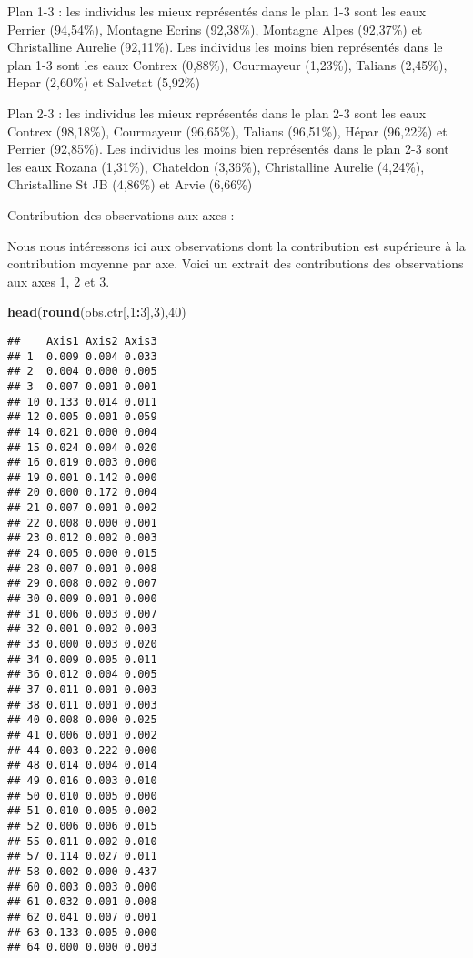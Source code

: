 \documentclass[]{article}
\newenvironment{Shaded}{\begin{snugshade}}{\end{snugshade}}
\newcommand{\KeywordTok}[1]{\textcolor[rgb]{0.13,0.29,0.53}{\textbf{#1}}}
\newcommand{\DecValTok}[1]{\textcolor[rgb]{0.00,0.00,0.81}{#1}}
\newcommand{\OperatorTok}[1]{\textcolor[rgb]{0.81,0.36,0.00}{\textbf{#1}}}
\newcommand{\NormalTok}[1]{#1}
\begin{document}
Plan 1-3 : les individus les mieux représentés dans le plan 1-3 sont les
eaux Perrier (94,54\%), Montagne Ecrins (92,38\%), Montagne Alpes
(92,37\%) et Christalline Aurelie (92,11\%). Les individus les moins
bien représentés dans le plan 1-3 sont les eaux Contrex (0,88\%),
Courmayeur (1,23\%), Talians (2,45\%), Hepar (2,60\%) et Salvetat
(5,92\%)

Plan 2-3 : les individus les mieux représentés dans le plan 2-3 sont les
eaux Contrex (98,18\%), Courmayeur (96,65\%), Talians (96,51\%), Hépar
(96,22\%) et Perrier (92,85\%). Les individus les moins bien représentés
dans le plan 2-3 sont les eaux Rozana (1,31\%), Chateldon (3,36\%),
Christalline Aurelie (4,24\%), Christalline St JB (4,86\%) et Arvie
(6,66\%)

Contribution des observations aux axes :

Nous nous intéressons ici aux observations dont la contribution est
supérieure à la contribution moyenne par axe. Voici un extrait des
contributions des observations aux axes 1, 2 et 3.

\begin{Shaded}
\begin{Highlighting}[]
\KeywordTok{head}\NormalTok{(}\KeywordTok{round}\NormalTok{(obs.ctr[,}\DecValTok{1}\OperatorTok{:}\DecValTok{3}\NormalTok{],}\DecValTok{3}\NormalTok{),}\DecValTok{40}\NormalTok{)}
\end{Highlighting}
\end{Shaded}

\begin{verbatim}
##    Axis1 Axis2 Axis3
## 1  0.009 0.004 0.033
## 2  0.004 0.000 0.005
## 3  0.007 0.001 0.001
## 10 0.133 0.014 0.011
## 12 0.005 0.001 0.059
## 14 0.021 0.000 0.004
## 15 0.024 0.004 0.020
## 16 0.019 0.003 0.000
## 19 0.001 0.142 0.000
## 20 0.000 0.172 0.004
## 21 0.007 0.001 0.002
## 22 0.008 0.000 0.001
## 23 0.012 0.002 0.003
## 24 0.005 0.000 0.015
## 28 0.007 0.001 0.008
## 29 0.008 0.002 0.007
## 30 0.009 0.001 0.000
## 31 0.006 0.003 0.007
## 32 0.001 0.002 0.003
## 33 0.000 0.003 0.020
## 34 0.009 0.005 0.011
## 36 0.012 0.004 0.005
## 37 0.011 0.001 0.003
## 38 0.011 0.001 0.003
## 40 0.008 0.000 0.025
## 41 0.006 0.001 0.002
## 44 0.003 0.222 0.000
## 48 0.014 0.004 0.014
## 49 0.016 0.003 0.010
## 50 0.010 0.005 0.000
## 51 0.010 0.005 0.002
## 52 0.006 0.006 0.015
## 55 0.011 0.002 0.010
## 57 0.114 0.027 0.011
## 58 0.002 0.000 0.437
## 60 0.003 0.003 0.000
## 61 0.032 0.001 0.008
## 62 0.041 0.007 0.001
## 63 0.133 0.005 0.000
## 64 0.000 0.000 0.003
\end{verbatim}
\end{document}
